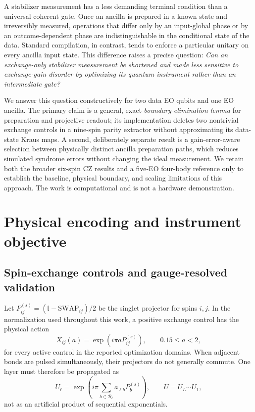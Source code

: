 \documentclass[aps,prx,twocolumn,superscriptaddress,10pt,longbibliography,floatfix]{revtex4-2}
\newcommand{\id}{\mathbb I}
\newcommand{\Ps}{P^{(s)}}
\begin{document}
A stabilizer measurement has a less demanding terminal condition than a universal coherent gate. Once an ancilla is prepared in a known state and irreversibly measured, operations that differ only by an input-global phase or by an outcome-dependent phase are indistinguishable in the conditional state of the data. Standard compilation, in contrast, tends to enforce a particular unitary on every ancilla input state. This difference raises a precise question: \emph{Can an exchange-only stabilizer measurement be shortened and made less sensitive to exchange-gain disorder by optimizing its quantum instrument rather than an intermediate gate?}

We answer this question constructively for two data EO qubits and one EO ancilla. The primary claim is a general, exact \emph{boundary-elimination lemma} for preparation and projective readout; its implementation deletes two nontrivial exchange controls in a nine-spin parity extractor without approximating its data-state Kraus maps. A second, deliberately separate result is a gain-error-aware selection between physically distinct ancilla preparation paths, which reduces simulated syndrome errors without changing the ideal measurement. We retain both the broader six-spin CZ results and a five-EO four-body reference only to establish the baseline, physical boundary, and scaling limitations of this approach. The work is computational and is not a hardware demonstration.

\section{Physical encoding and instrument objective}
\label{sec:model}
\subsection{Spin-exchange controls and gauge-resolved validation}
Let $\Ps_{ij}=(\id-\mathrm{SWAP}_{ij})/2$ be the singlet projector for spins $i,j$. In the normalization used throughout this work, a positive exchange control has the physical action
\begin{equation}
 X_{ij}(a)=\exp(i\pi a\Ps_{ij}),\qquad 0.15\leq a<2,
 \label{eq:single}
\end{equation}
for every active control in the reported optimization domains. When adjacent bonds are pulsed simultaneously, their projectors do not generally commute. One layer must therefore be propagated as
\begin{equation}
 U_\ell=\exp\!\left(i\pi\sum_{b\in\mathcal B_\ell}a_{\ell b}\Ps_b\right),\qquad U=U_L\cdots U_1,
 \label{eq:layer}
\end{equation}
not as an artificial product of sequential exponentials.
\end{document}

